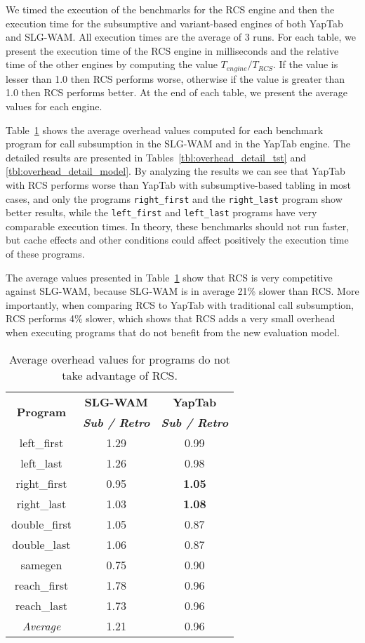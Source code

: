 We timed the execution of the benchmarks for the RCS engine and then the execution time
for the subsumptive and variant-based engines of both YapTab and SLG-WAM. All execution times are
the average of 3 runs. For each table,
we present the execution time of the RCS engine in milliseconds and the relative time
of the other engines by computing the value $T_{engine} / T_{RCS}$.
If the value is lesser than 1.0 then RCS performs worse, otherwise if the value is greater than
1.0 then RCS performs better. At the end of each table, we present the average values for
each engine.

Table~\ref{tbl:overhead_overview} shows the average overhead values computed for each benchmark program
for call subsumption in the SLG-WAM and in the YapTab engine. The detailed results are presented
in Tables~\ref{tbl:overhead_detail_tst} and \ref{tbl:overhead_detail_model}.
By analyzing the results we can see that YapTab with RCS performs worse
than YapTab with subsumptive-based tabling in most cases, and only the
programs \texttt{right\_first} and the \texttt{right\_last} program show better results,
while the \texttt{left\_first} and \texttt{left\_last} programs have very comparable execution times.
In theory, these benchmarks should not run faster, but cache effects and other
conditions could affect positively the execution time of these programs.

The average values presented in Table~\ref{tbl:overhead_overview} show that
RCS is very competitive against SLG-WAM, because SLG-WAM is in average 21\% slower than RCS. More
importantly, when comparing RCS to YapTab with traditional call subsumption, RCS performs 4\% slower,
which shows that RCS adds a very small overhead when executing programs that do not benefit from the
new evaluation model.

\begin{table}[ht]
\centering
  \begin{tabular}{ccc}
   \hline
    \hline
    \multirow{2}{*}{\textbf{Program}} & \textbf{SLG-WAM} & \textbf{YapTab} \\
    & \textbf{\textit{\small{Sub / Retro}}} & \textbf{\textit{\small{Sub / Retro}}} \\
   \hline
   \hline
   left\_first & 1.29 & 0.99 \\
   left\_last &  1.26  & 0.98 \\
   right\_first & 0.95 & \textbf{1.05} \\
   right\_last & 1.03 & \textbf{1.08} \\
   double\_first & 1.05 & 0.87 \\
   double\_last & 1.06 & 0.87 \\
   samegen & 0.75 & 0.90 \\
   reach\_first  &  1.78  & 0.96 \\
   reach\_last  &  1.73  & 0.96 \\
\hline
\hline
\textit{Average} &  1.21 &  0.96 \\
\hline
\hline
\end{tabular}
\caption{Average overhead values for programs do not take advantage of RCS.}
\label{tbl:overhead_overview}
\end{table}

